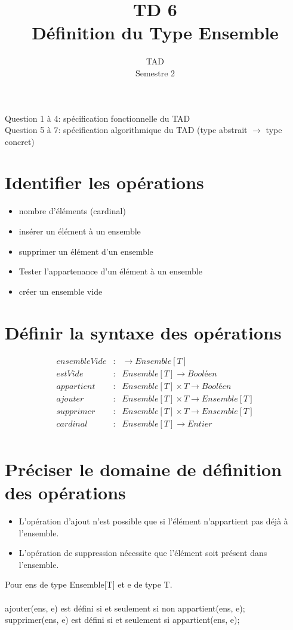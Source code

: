 \documentclass{article}
\title{TD 6\\ Définition du Type Ensemble}
\date{TAD\\ Semestre 2}
\begin{document}
	\maketitle
	Question 1 à 4: spécification fonctionnelle du TAD\\
	Question 5 à 7: spécification algorithmique du TAD 
			(type abstrait $\rightarrow$ type concret)

	\section{Identifier les opérations}
		\begin{itemize}
			\item nombre d'éléments (cardinal)
			\item insérer un élément à un ensemble
			\item supprimer un élément d'un ensemble
			\item Tester l'appartenance d'un élément à un ensemble
			\item créer un ensemble vide
		\end{itemize}
	\section{Définir la syntaxe des opérations}
		\begin{eqnarray*}
			ensembleVide&:& \rightarrow Ensemble[T] \\
			estVide&:& Ensemble[T] \rightarrow Booléen\\ 
			appartient&:& Ensemble[T] \times T \rightarrow Booléen \\
			ajouter&:& Ensemble[T] \times T \rightarrow Ensemble[T]\\
			supprimer&:& Ensemble[T] \times T \rightarrow Ensemble[T]\\
			cardinal&:& Ensemble[T] \rightarrow Entier\\
		\end{eqnarray*}
	 \section{Préciser le domaine de définition des opérations}
	 \begin{itemize}
		\item L'opération d'ajout n'est possible que si l'élément n'appartient
		pas déjà à l'ensemble.
		\item L'opération de suppression nécessite que l'élément soit présent
		dans l'ensemble.
	\end{itemize}	
	Pour ens de type Ensemble[T] et e de type T.\\ \\
		ajouter(ens, e) est défini si et seulement si non appartient(ens, e);\\
		supprimer(ens, e) est défini si et seulement si appartient(ens, e);\\
\end{document}
